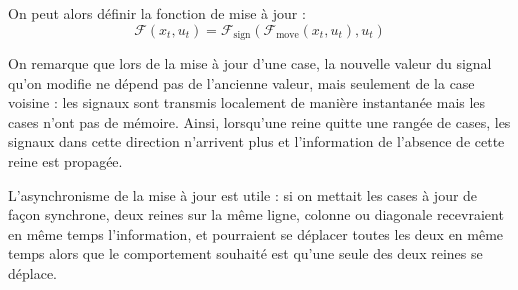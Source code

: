 \documentclass[11pt, openany]{article}
\begin{document}
\bigskip

\noindent
On peut alors définir la fonction de mise à jour : $$\mathcal{F}(x_t, u_t) = \mathcal{F}_{\mathrm{sign}}(\mathcal{F}_{\mathrm{move}}(x_t, u_t), u_t)$$


On remarque que lors de la mise à jour d'une case, la nouvelle valeur du signal qu'on modifie ne dépend pas de l'ancienne valeur, mais seulement de la case voisine : les signaux sont transmis localement de manière instantanée mais les cases n'ont pas de mémoire. Ainsi, lorsqu'une reine quitte une rangée de cases, les signaux dans cette direction n'arrivent plus et l'information de l'absence de cette reine est propagée. 

L'asynchronisme de la mise à jour est utile : si on mettait les cases à jour de façon synchrone, deux reines sur la même ligne, colonne ou diagonale recevraient en même temps l'information, et pourraient se déplacer toutes les deux en même temps alors que le comportement souhaité est qu'une seule des deux reines se déplace. 


\end{document}
